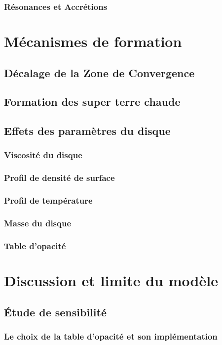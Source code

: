 \documentclass[logos,parttoc]{bordeaux-thesis}
\begin{document}
\subsection{Résonances et Accrétions}

\chapter{Mécanismes de formation}
\section{Décalage de la Zone de Convergence}
\section{Formation des super terre chaude}
\section{Effets des paramètres du disque}
\subsection{Viscosité du disque}
\subsection{Profil de densité de surface}
\subsection{Profil de température}
\subsection{Masse du disque}
\subsection{Table d'opacité}

\chapter{Discussion et limite du modèle}\label{sec:discussion}
\section{Étude de sensibilité}
\subsection{Le choix de la table d'opacité et son implémentation}
\end{document}
